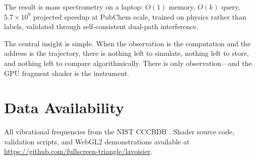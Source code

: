 \documentclass[11pt,twocolumn,a4paper]{article}
\theoremstyle{definition}
\theoremstyle{remark}
\begin{document}
The result is mass spectrometry on a laptop: $O(1)$ memory, $O(k)$ query, $5.7 \times 10^9$ projected speedup at PubChem scale, trained on physics rather than labels, validated through self-consistent dual-path interference.

The central insight is simple. When the observation is the computation and the address is the trajectory, there is nothing left to simulate, nothing left to store, and nothing left to compare algorithmically. There is only observation---and the GPU fragment shader is the instrument.

\section*{Data Availability}

All vibrational frequencies from the NIST CCCBDB \citep{johnson2022}. Shader source code, validation scripts, and WebGL2 demonstrations available at \url{https://github.com/fullscreen-triangle/lavoisier}.



\end{document}
